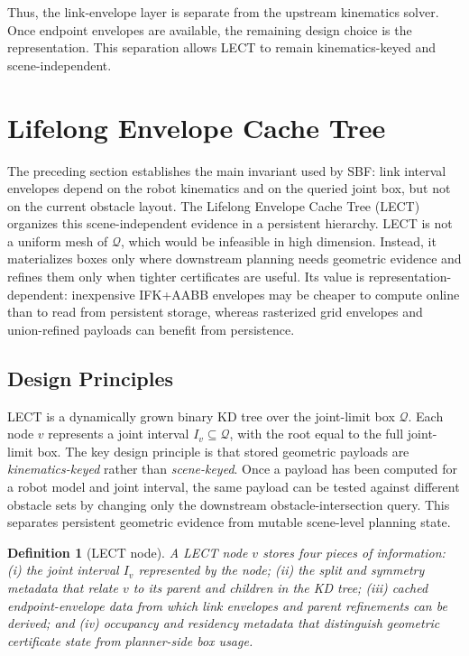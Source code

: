 \documentclass[journal]{IEEEtran}
\DeclareRobustCommand{\textsc}[1]{\textnormal{\MakeUppercase{#1}}}
\newtheorem{definition}{Definition}
\newcommand{\sbf}{\textsc{SBF}}
\newcommand{\Q}{\ensuremath{\mathcal{Q}}}
\begin{document}
Thus, the link-envelope layer is separate from the upstream kinematics solver.
Once endpoint envelopes are available, the remaining design choice is the
representation. This separation allows LECT to remain kinematics-keyed and
scene-independent.

\section{Lifelong Envelope Cache Tree}\label{sec:lect}

The preceding section establishes the main invariant used by \sbf{}: link
interval envelopes depend on the robot kinematics and on the queried joint
box, but not on the current obstacle layout. The Lifelong Envelope Cache Tree
(LECT) organizes this scene-independent evidence in a persistent hierarchy.
LECT is not a uniform mesh of $\Q$, which would be infeasible in high dimension.
Instead, it materializes boxes only where downstream planning needs geometric
evidence and refines them only when tighter certificates are useful. Its value
is representation-dependent: inexpensive IFK+AABB envelopes may be cheaper to
compute online than to read from persistent storage, whereas rasterized grid
envelopes and union-refined payloads can benefit from persistence.

\subsection{Design Principles}\label{sec:lect_design}

LECT is a dynamically grown binary KD tree over the joint-limit box $\Q$. Each
node $v$ represents a joint interval $I_v \subseteq \Q$, with the root equal to
the full joint-limit box. The key design principle is that stored geometric
payloads are \emph{kinematics-keyed} rather than \emph{scene-keyed}. Once a
payload has been computed for a robot model and joint interval, the same
payload can be tested against different obstacle sets by changing only the
downstream obstacle-intersection query. This separates persistent geometric
evidence from mutable scene-level planning state.

\begin{definition}[LECT node]
A LECT node $v$ stores four pieces of information: (i) the joint interval
$I_v$ represented by the node; (ii) the split and symmetry metadata that relate
$v$ to its parent and children in the KD tree; (iii) cached endpoint-envelope
data from which link envelopes and parent refinements can be derived; and
(iv) occupancy and residency metadata that distinguish geometric certificate
state from planner-side box usage.
\end{definition}
\end{document}
